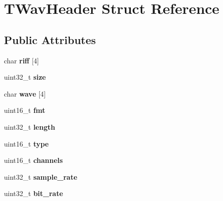\hypertarget{structTWavHeader}{\section{T\-Wav\-Header Struct Reference}
\label{structTWavHeader}
}
\subsection*{Public Attributes}
\begin{DoxyCompactItemize}
\item 
\hypertarget{structTWavHeader_a8f7cef0ea47060bc2c39215d65190cf0}{char {\bfseries riff} \mbox{[}4\mbox{]}}\label{structTWavHeader_a8f7cef0ea47060bc2c39215d65190cf0}

\item 
\hypertarget{structTWavHeader_ab7a5d66f1d330dcaeec23fbac8e5170c}{uint32\-\_\-t {\bfseries size}}\label{structTWavHeader_ab7a5d66f1d330dcaeec23fbac8e5170c}

\item 
\hypertarget{structTWavHeader_a78a648bed553acac2435561542c547c3}{char {\bfseries wave} \mbox{[}4\mbox{]}}\label{structTWavHeader_a78a648bed553acac2435561542c547c3}

\item 
\hypertarget{structTWavHeader_ae618233b087bf9af4d51d1877857ceac}{uint16\-\_\-t {\bfseries fmt}}\label{structTWavHeader_ae618233b087bf9af4d51d1877857ceac}

\item 
\hypertarget{structTWavHeader_a2934af23aeee8dd8612f380cffb93f5c}{uint32\-\_\-t {\bfseries length}}\label{structTWavHeader_a2934af23aeee8dd8612f380cffb93f5c}

\item 
\hypertarget{structTWavHeader_a91b2a0acae0e0bb3040b741521addc44}{uint16\-\_\-t {\bfseries type}}\label{structTWavHeader_a91b2a0acae0e0bb3040b741521addc44}

\item 
\hypertarget{structTWavHeader_a8e5a38b7cc4aeb25e71a3ad83e5c820a}{uint16\-\_\-t {\bfseries channels}}\label{structTWavHeader_a8e5a38b7cc4aeb25e71a3ad83e5c820a}

\item 
\hypertarget{structTWavHeader_ac81c6f1ee53a8b1dfeb58b7628f5956f}{uint32\-\_\-t {\bfseries sample\-\_\-rate}}\label{structTWavHeader_ac81c6f1ee53a8b1dfeb58b7628f5956f}

\item 
\hypertarget{structTWavHeader_a2470e86e5258bd285262323a3ab96771}{uint32\-\_\-t {\bfseries bit\-\_\-rate}}\label{structTWavHeader_a2470e86e5258bd285262323a3ab96771}


\end{DoxyCompactItemize}
